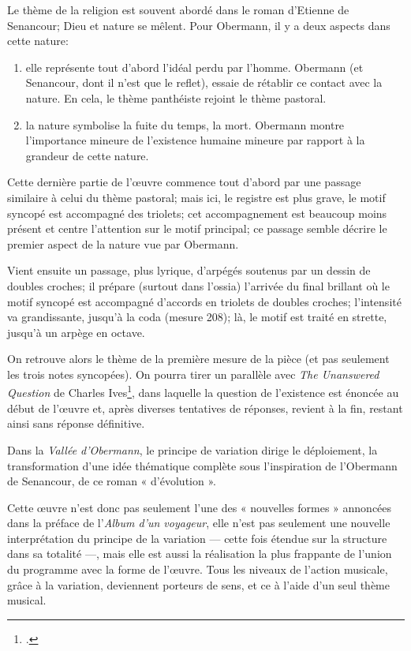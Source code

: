 \documentclass[11pt,a4paper]{scrartcl}
\begin{document}
Le thème de la religion est souvent abordé dans le roman d'Etienne de Senancour; Dieu et nature se mêlent.
Pour Obermann, il y a deux aspects dans cette nature:
\begin{enumerate}
\item elle représente tout d'abord l'idéal perdu par l'homme. Obermann (et Senancour, dont il n'est que le reflet),
essaie de rétablir ce contact avec la nature. En cela, le thème panthéiste rejoint le thème pastoral.
\item la nature symbolise la fuite du temps, la mort. Obermann montre l'importance mineure de l'existence humaine mineure
par rapport à la grandeur de cette nature.
\end{enumerate}

Cette dernière partie de l'\oe{}uvre commence tout d'abord par une passage similaire à celui du thème pastoral;
mais ici, le registre est plus grave, le motif syncopé est accompagné des triolets; cet accompagnement est beaucoup
moins présent et centre l'attention sur le motif principal; ce passage semble décrire le premier aspect de la nature vue
par Obermann.

Vient ensuite un passage, plus lyrique, d'arpégés soutenus par un dessin de doubles croches; il prépare
(surtout dans l'ossia) l'arrivée du final brillant où le motif syncopé est accompagné d'accords en triolets de doubles croches;
l'intensité va grandissante, jusqu'à la coda (mesure 208); là, le motif est traité en strette, jusqu'à un arpège en octave.

On retrouve alors le thème de la première mesure de la pièce (et pas seulement les trois notes syncopées).
On pourra tirer un parallèle avec \emph{The Unanswered Question} de Charles Ives\footcite{ives:unansweredquestion}, dans laquelle la question de l'existence est
énoncée au début de l'\oe{}uvre et, après diverses tentatives de réponses, revient à la fin, restant ainsi sans réponse définitive.

Dans la \emph{Vallée d'Obermann}, le principe de variation dirige le déploiement, la transformation d'une idée
thématique complète sous l'inspiration de l'Obermann de Senancour, de ce roman « d'évolution ».

Cette \oe{}uvre n'est donc pas seulement l'une des « nouvelles formes » annoncées dans la préface de l'\emph{Album
d'un voyageur}, elle n'est pas seulement une nouvelle interprétation du principe de la variation --- cette fois
étendue sur la structure dans sa totalité ---, mais elle est aussi la réalisation la plus frappante de l'union du
programme avec la forme de l'\oe{}uvre. Tous les niveaux de l'action musicale, grâce à la variation, deviennent porteurs de sens, et ce à l'aide d'un
seul thème musical.
\end{document}
